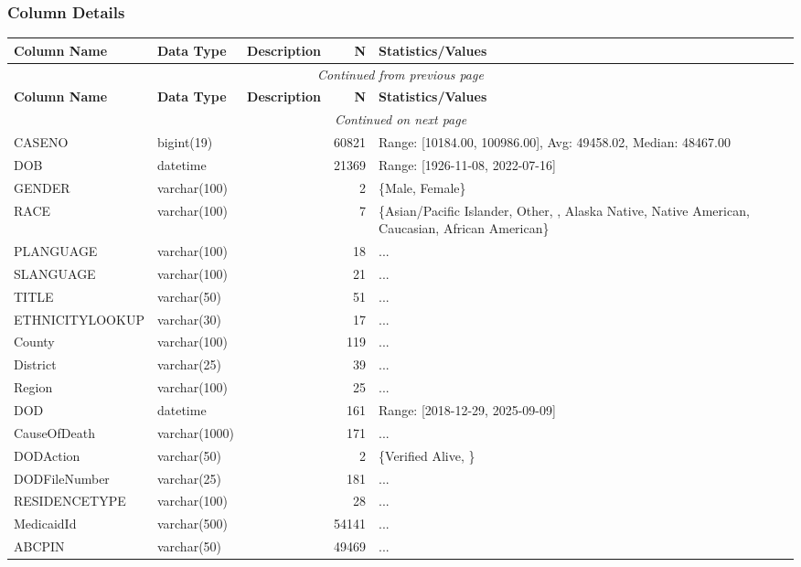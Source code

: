 \begin{landscape}
\subsubsection{Column Details}
\begin{longtable}{|l|l|l|r|p{6cm}|}
\hline
\textbf{Column Name} & \textbf{Data Type} & \textbf{Description} & \textbf{N} & \textbf{Statistics/Values} \\
\hline
\endfirsthead
\multicolumn{5}{c}{\textit{Continued from previous page}} \\
\hline
\textbf{Column Name} & \textbf{Data Type} & \textbf{Description} & \textbf{N} & \textbf{Statistics/Values} \\
\hline
\endhead
\hline
\multicolumn{5}{c}{\textit{Continued on next page}} \\
\endfoot
\hline
\endlastfoot
CASENO & bigint(19) &  & 60821 & Range: [10184.00, 100986.00], Avg: 49458.02, Median: 48467.00 \\
\hline
DOB & datetime &  & 21369 & Range: [1926-11-08, 2022-07-16] \\
\hline
GENDER & varchar(100) &  & 2 & \{Male, Female\} \\
\hline
RACE & varchar(100) &  & 7 & \{Asian/Pacific Islander, Other, , Alaska Native, Native American, Caucasian, African American\} \\
\hline
PLANGUAGE & varchar(100) &  & 18 & ... \\
\hline
SLANGUAGE & varchar(100) &  & 21 & ... \\
\hline
TITLE & varchar(50) &  & 51 & ... \\
\hline
ETHNICITYLOOKUP & varchar(30) &  & 17 & ... \\
\hline
County & varchar(100) &  & 119 & ... \\
\hline
District & varchar(25) &  & 39 & ... \\
\hline
Region & varchar(100) &  & 25 & ... \\
\hline
DOD & datetime &  & 161 & Range: [2018-12-29, 2025-09-09] \\
\hline
CauseOfDeath & varchar(1000) &  & 171 & ... \\
\hline
DODAction & varchar(50) &  & 2 & \{Verified Alive, \} \\
\hline
DODFileNumber & varchar(25) &  & 181 & ... \\
\hline
RESIDENCETYPE & varchar(100) &  & 28 & ... \\
\hline
MedicaidId & varchar(500) &  & 54141 & ... \\
\hline
ABCPIN & varchar(50) &  & 49469 & ... \\

\end{longtable}
\end{landscape}
